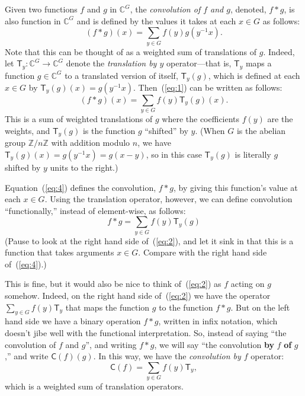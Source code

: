 \documentclass{article}
\newcommand\C{\ensuremath{\mathbb{C}}}
\newcommand\Z{\ensuremath{\mathbb{Z}}}
\newcommand{\lt}[1]{\ensuremath{\mathsf{#1}}}
\newcommand{\T}{\lt{T}}       %
\newcommand\conv{\lt{C}}
\begin{document}
Given two functions $f$ and $g$ in $\C^G$, the \emph{convolution of
$f$ and $g$}, denoted, $f*g$, is also function in $\C^G$ and is
defined by the values it takes at each $x\in G$ as follows:
\begin{equation}
\label{eq:1}  
(f*g)(x) = \sum_{y \in G} f(y) g(y^{-1}x).
\end{equation}
Note that this can be thought of as a weighted sum of translations of $g$.
Indeed, let $\T_y: \C^G\rightarrow \C^G$ denote
the \emph{translation by $y$} operator---that is, $\T_y$ maps 
a function $g\in \C^G$ to a translated version of itself, $\T_y(g)$, which is defined at each 
$x \in G$ by $\T_y(g)(x) = g(y^{-1}x)$.
Then~(\ref{eq:1}) can be written as follows:
\begin{equation}
\label{eq:4}  
(f*g)(x) = \sum_{y \in G} f(y) \T_y(g)(x).
\end{equation}
This is a sum of weighted translations of $g$ where 
the coefficients $f(y)$ are the weights, and 
$\T_y(g)$ is the function $g$ ``shifted'' by $y$. (When $G$ is the abelian
group $\Z/n\Z$ with addition modulo $n$, we have
$\T_y(g)(x) = g(y^{-1}x) = g(x-y)$, so in this case
$\T_y(g)$ is literally $g$ shifted by $y$ units to the right.)

Equation~(\ref{eq:4}) defines the convolution, $f * g$, by giving this
function's value at each $x\in G$. Using the 
translation operator, however, we can define convolution
 ``functionally,'' instead of element-wise, as follows:
\begin{equation}
\label{eq:2}  
f*g = \sum_{y \in G} f(y) \T_y(g)
\end{equation}
(Pause to look at the right hand side of~(\ref{eq:2}), and let it sink in that
this is a function that takes arguments $x\in G$. Compare with the right
hand side of~(\ref{eq:4}).)

 This is fine, but it would also be nice to think of~(\ref{eq:2}) as $f$ acting
on $g$ somehow.  Indeed, on the right hand side of~(\ref{eq:2}) we have the operator 
$\sum_{y \in G} f(y) \T_y$ that maps the function $g$ to the function $f*g$.  But
on the left hand side we have a binary operation $f*g$, written in infix
notation, which doesn't jibe well with the functional interpretation.  So,
instead of saying ``the convolution of $f$ and $g$'', and writing $f*g$, we will
say
``the convolution {\bf by} $f$ {\bf of} $g$,'' and write $\conv(f)(g)$. In this
way, we have the \emph{convolution by $f$} operator:
\begin{equation}
\label{eq:3}  
\conv(f) = \sum_{y \in G} f(y) \T_y,
\end{equation}
which is a weighted sum of translation operators.  
\end{document}
